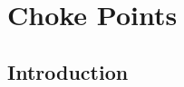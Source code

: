 \chapter{Choke Points}
\label{sec:choke-points}

\newcommand{\tpcCard}[1]{\colorbox{lightgray}{\tt TPC-H #1}}
\newcommand{\tpcCPSection}[4][]{%
\subsection*{%
CP-#2: [#3] #4%
\ifthenelse{\equal{#1}{}}{}{\hfill \tpcCard{#1}}%
}%
\label{choke_point_#2}}

\newcommand{\snbCPSection}[4][]{%
\subsection*{%
CP-#2: [#3] #4%
{\hfill {\colorbox{lightgray}{\tt From SNB}}}%
}%
\label{choke_point_#2}}

\newcommand{\newCPSection}[4][]{%
\subsection*{%
CP-#2: [#3] #4%
{\hfill {\colorbox{lightgray}{\tt New in FinBench}}}%
}%
\label{choke_point_#2}}


\section*{Introduction}

